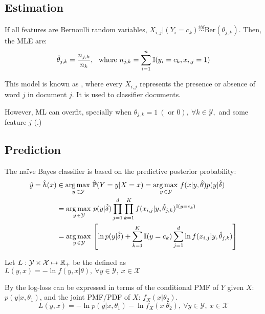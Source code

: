 \subsection{Estimation}
If all features are Bernoulli random variables, $X_{i,j}|(Y_i=c_k)\overset{iid}{\sim}\text{Ber}(\theta_{j,k})$. Then, the MLE are:
\begin{equation*}
    \hat{\theta}_{j,k} = \frac{n_{j,k}}{n_k},\ \text{ where } n_{j,k}=\sum_{i=1}^n\operatorname{\mathbb{I}}(y_i=c_k,x_{i,j}=1)
\end{equation*}

This model is known as , where every $X_{i,j}$ represents the presence or absence of word $j$ in document $j$. It is used to classifier documents. 

However, ML can overfit, specially when $\hat{\theta}_{j,k}=1\ (\text{ or } 0),\ \forall k\in\mathcal{Y},$ and some feature $j$ (.)


\subsection{Prediction}
The naïve Bayes classifier is based on the predictive posterior probability:
\begin{align*}
    \hat{y}=\hat{h}(x) &\in   \operatorname*{arg\,max\,}_{y\,\in\mathcal{Y}}\hat{\mathbb{P}}(Y=y|X={x})  = \operatorname*{arg\,max\,}_{y\,\in\mathcal{Y}} f(x|y,\hat{\theta})p(y|\hat{\delta})\\
    &= \operatorname*{arg\,max\,}_{y\,\in\mathcal{Y}}p(y|\hat{\delta})\prod_{j=1}^d\prod_{k=1}^K  f(x_{i,j}|y,\hat{\theta}_{j,k})^{\operatorname{\mathbb{I}}(y=c_k)}\\
    &= \operatorname*{arg\,max\,}_{y\,\in\mathcal{Y}}\left[ \ln p(y|\hat{\delta})+\sum_{k=1}^K\operatorname{\mathbb{I}}(y=c_k)\sum_{j=1}^d  \ln f(x_{i,j}|y,\hat{\theta}_{j,k})\right]
\end{align*}




\clearpage
Let $L:\mathcal{Y}\times\mathcal{X}\mapsto\operatorname{\mathbb{R}}_+$ be the  defined as $L(y,x) = -\ln f(y,x|\theta),\ \forall y\in\mathcal{Y},\ x\in\mathcal{X}$









By  the log-loss can be expressed in terms of the conditional PMF of $Y$ given $X$: $p(y|x,\theta_1)$, and the joint PMF/PDF of $X$: $f_X(x|\theta_2)$.
\begin{equation*}
    L(y,x) = -\ln p(y|x,\theta_1)-\ln f_X(x|\theta_2),\ \forall y\in\mathcal{Y},\ x\in\mathcal{X}
\end{equation*}












